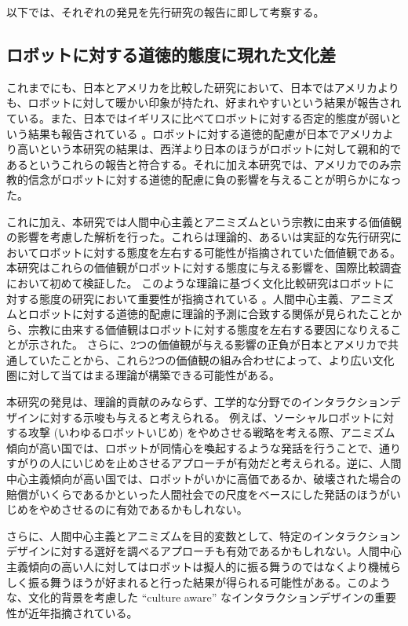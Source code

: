 \documentclass[a4j,12pt]{jreport}
\begin{document}
以下では、それぞれの発見を先行研究の報告に即して考察する。

\subsection{ロボットに対する道徳的態度に現れた文化差}
これまでにも、日本とアメリカを比較した研究\cite{mania}において、日本ではアメリカよりも、ロボットに対して暖かい印象が持たれ、好まれやすいという結果が報告されている。また、日本ではイギリスに比べてロボットに対する否定的態度が弱いという結果も報告されている\cite{humuk} 。ロボットに対する道徳的配慮が日本でアメリカより高いという本研究の結果は、西洋より日本のほうがロボットに対して親和的であるというこれらの報告と符合する。それに加え本研究では、アメリカでのみ宗教的信念がロボットに対する道徳的配慮に負の影響を与えることが明らかになった。


これに加え、本研究では人間中心主義とアニミズムという宗教に由来する価値観の影響を考慮した解析を行った。これらは理論的\cite{mania, gygi}、あるいは実証的\cite{okanda}な先行研究においてロボットに対する態度を左右する可能性が指摘されていた価値観である。本研究はこれらの価値観がロボットに対する態度に与える影響を、国際比較調査において初めて検証した。
このような理論に基づく文化比較研究はロボットに対する態度の研究において重要性が指摘されている\cite{review} 。人間中心主義、アニミズムとロボットに対する道徳的配慮に理論的予測に合致する関係が見られたことから、宗教に由来する価値観はロボットに対する態度を左右する要因になりえることが示された。
さらに、2つの価値観が与える影響の正負が日本とアメリカで共通していたことから、これら2つの価値観の組み合わせによって、より広い文化圏に対して当てはまる理論が構築できる可能性がある。


本研究の発見は、理論的貢献のみならず、工学的な分野でのインタラクションデザインに対する示唆も与えると考えられる。
例えば、ソーシャルロボットに対する攻撃 (いわゆるロボットいじめ\cite{ijime}) をやめさせる戦略を考える際、アニミズム傾向が高い国では、ロボットが同情心を喚起するような発話を行うことで、通りすがりの人にいじめを止めさせるアプローチが有効だと考えられる。逆に、人間中心主義傾向が高い国では、ロボットがいかに高価であるか、破壊された場合の賠償がいくらであるかといった人間社会での尺度をベースにした発話のほうがいじめをやめさせるのに有効であるかもしれない。

さらに、人間中心主義とアニミズムを目的変数として、特定のインタラクションデザインに対する選好を調べるアプローチも有効であるかもしれない。人間中心主義傾向の高い人に対してはロボットは擬人的に振る舞うのではなくより機械らしく振る舞うほうが好まれると行った結果が得られる可能性がある。このような、文化的背景を考慮した ``culture aware''\cite{cultu} なインタラクションデザインの重要性が近年指摘されている。
\end{document}
